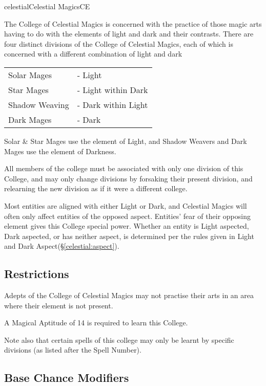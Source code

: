 \begin{college}[1.3]{celestial}{Celestial Magics}{CE}

The College of Celestial Magics is concerned with the practice of
those magic arts having to do with the elements of light and dark and
their contrasts.  There are four distinct divisions of the College of
Celestial Magics, each of which is concerned with a different
combination of light and dark

\begin{tabular}{ll}
Solar Mages    & - Light \\
Star Mages     & - Light within Dark \\
Shadow Weaving & - Dark within Light \\
Dark Mages     & - Dark \\
\end{tabular}

Solar \& Star Mages use the element of Light, and Shadow Weavers
and Dark Mages use the element of Darkness. 

All members of the college must be associated with only one division
of this College, and may only change divisions by forsaking their
present division, and relearning the new division as if it were a
different college.

Most entities are aligned with either Light or Dark, and Celestial
Magics will often only affect entities of the opposed aspect.
Entities' fear of their opposing element gives this College special
power.  Whether an entity is Light aspected, Dark aspected, or has
neither aspect, is determined per the rules given in Light and Dark
Aspect(\S\ref{celestial:aspect}).

\subsection{Restrictions}

Adepts of the College of Celestial Magics may not practise their arts
in an area where their element is not present.

A Magical Aptitude of 14 is required to learn this College. 

Note also that certain spells of this college may only be learnt by
specific divisions (as listed after the Spell Number).

\subsection{Base Chance Modifiers}


\end{college}
